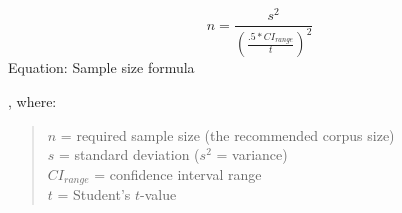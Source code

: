 \begin{equation}
    \label{eq:sample_size_formula}
    n=\frac{s^2}{(\frac{.5*CI_{range}}{t})^2}
\end{equation}
\noindent Equation: Sample size formula

, where:
\begin{quote}
    $n$ = required sample size (the recommended corpus size) \\
    $s$ = standard deviation ($s^2$ = variance) \\
    $CI_{range}$ = confidence interval range \\
    $t$ = Student's $t$-value
\end{quote}